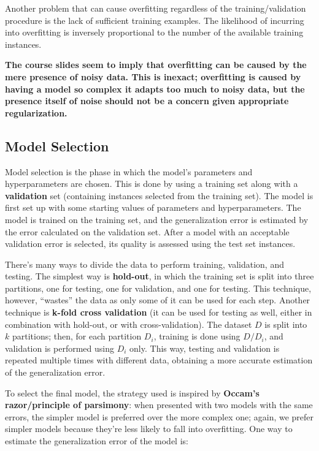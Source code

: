 Another problem that can cause overfitting regardless of the training/validation procedure is the lack of sufficient training examples. The likelihood of incurring into overfitting is inversely proportional to the number of the available training instances. 

\textbf{The course slides seem to imply that overfitting can be caused by the mere presence of noisy data. This is inexact; overfitting is caused by having a model so complex it adapts too much to noisy data, but the presence itself of noise should not be a concern given appropriate regularization.}

\subsection{Model Selection}

Model selection is the phase in which the model's parameters and hyperparameters are chosen. This is done by using a training set along with a \textbf{validation} set (containing instances selected from the training set). The model is first set up with some starting values of parameters and hyperparameters. The model is trained on the training set, and the generalization error is estimated by the error calculated on the validation set. After a model with an acceptable validation error is selected, its quality is assessed using the test set instances.

There's many ways to divide the data to perform training, validation, and testing. The simplest way is \textbf{hold-out}, in which the training set is split into three partitions, one for testing, one for validation, and one for testing. This technique, however, ``wastes'' the data as only some of it can be used for each step. Another technique is \textbf{k-fold cross validation} (it can be used for testing as well, either in combination with hold-out, or with cross-validation). The dataset $D$ is split into $k$ partitions; then, for each partition $D_i$, training is done using $D / D_i$, and validation is performed using $D_i$ only. This way, testing and validation is repeated multiple times with different data, obtaining a more accurate estimation of the generalization error.

To select the final model, the strategy used is inspired by \textbf{Occam's razor/principle of parsimony}: when presented with two models with the same errors, the simpler model is preferred over the more complex one; again, we prefer simpler models because they're less likely to fall into overfitting. One way to estimate the generalization error of the model is:

